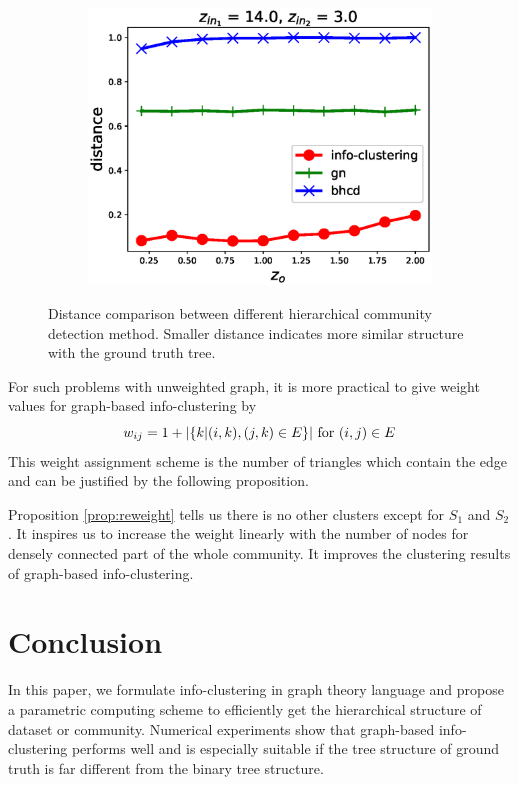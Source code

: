 \documentclass{article}
\begin{document}
\begin{figure}
\begin{subfigure}{0.33\textwidth}
		\includegraphics[width=\textwidth]{pic/z_o.eps}
		\caption{}
	\end{subfigure}
	\caption{Distance comparison between different hierarchical community detection method. Smaller distance indicates more similar structure with the ground truth tree.}\label{fig:cdr}	
\end{figure}

For such problems with unweighted graph, it is more practical to give weight values for graph-based info-clustering by 
\begin{equation}
    w_{ij} = 1 + \lvert\{k | (i,k),(j,k) \in E \}\rvert \textrm{ for } (i,j) \in E
\end{equation}
This weight assignment scheme is the number of triangles which contain the edge and can be justified by the following proposition.



Proposition \ref{prop:reweight} tells us there is no other clusters except for $S_1$ and  $S_2$. It inspires us to increase the weight linearly with the number of nodes for densely connected part of the whole community. It improves the clustering results of graph-based info-clustering.



\section{Conclusion}\label{sec:conclusion}
In this paper, we formulate info-clustering in graph theory language and propose a parametric computing scheme to efficiently get the hierarchical structure of dataset or community. Numerical experiments show that graph-based info-clustering performs well and is especially suitable if the tree structure of ground truth is far different from the binary tree structure.






\end{document}
